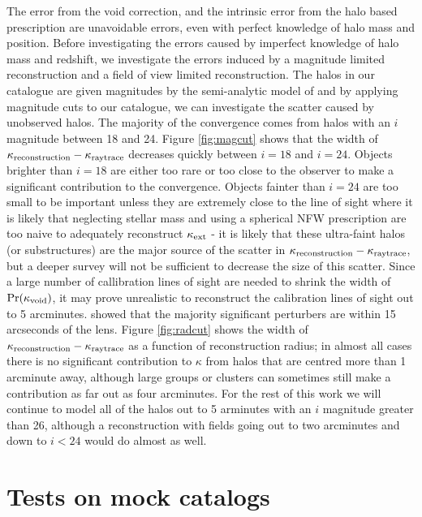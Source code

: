 \documentclass[useAMS,usenatbib]{mn2e}
\begin{document}
The error from the void correction, and the intrinsic error from the halo based prescription are unavoidable errors, even with perfect knowledge of halo mass and position. Before investigating the errors caused by imperfect knowledge of halo mass and redshift, we investigate the errors induced by a magnitude limited reconstruction and a field of view limited reconstruction. The halos in our catalogue are given magnitudes by the semi-analytic model of \citet{SAM} and by applying magnitude cuts to our catalogue, we can investigate the scatter caused by unobserved halos. The majority of the convergence comes from halos with an $i$ magnitude between 18 and 24. Figure \ref{fig:magcut} shows that the width of $\kappa_{\rm reconstruction}-\kappa_{\rm raytrace}$ decreases quickly between $i=18$ and $i=24$. Objects brighter than $i=18$ are either too rare or too close to the observer to make a significant contribution to the convergence. Objects fainter than $i=24$ are too small to be important unless they are extremely close to the line of sight where it is likely that neglecting stellar mass and using a spherical NFW prescription are too naive to adequately reconstruct $\kappa_{\rm ext}$ - it is likely that these ultra-faint halos (or substructures) are the major source of the scatter in $\kappa_{\rm reconstruction}-\kappa_{\rm raytrace}$, but a deeper survey will not be sufficient to decrease the size of this scatter. Since a large number of callibration lines of sight are needed to shrink the width of ${\rm Pr}(\kappa_{\rm void})$, it may prove unrealistic to reconstruct the calibration lines of sight out to 5 arcminutes. \citet{Auger2007} showed that the majority significant perturbers are within 15 arcseconds of the lens. Figure \ref{fig:radcut} shows the width of $\kappa_{\rm reconstruction}-\kappa_{\rm raytrace}$ as a function of reconstruction radius; in almost all cases there is no significant contribution to $\kappa$ from halos that are centred more than 1 arcminute away, although large groups or clusters can sometimes still make a contribution as far out as four arcminutes. For the rest of this work we will continue to model all of the halos out to 5 arminutes with an $i$ magnitude greater than 26, although a reconstruction with fields going out to two arcminutes and down to $i<24$ would do almost as well.




\section{Tests on mock catalogs}
\label{sec:obsMstar+z}
\end{document}
